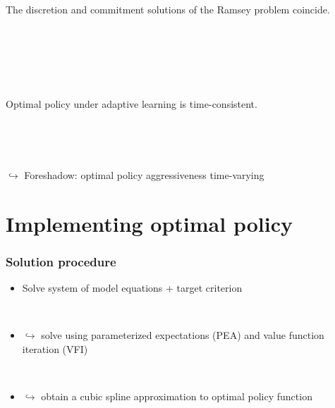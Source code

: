 \documentclass[11pt]{beamer}
\begin{document}
\begin{frame}
	\frametitle{}
	\label{no_commitment}

\begin{lemma} The discretion and commitment solutions of the Ramsey problem coincide. 
\end{lemma}

\

\hfill \hyperlink{no_commitment_intuition}{}

\

\

\begin{corollary} Optimal policy under adaptive learning is time-consistent. 
\end{corollary}


\

\

$\hookrightarrow $ Foreshadow: optimal policy aggressiveness time-varying

\vfill




\end{frame}

\section{Implementing optimal policy}


\begin{frame}
	\frametitle{Solution procedure}
	
\begin{itemize}
\item[] Solve system of model equations + target criterion 

\

\item[] $\hookrightarrow$ solve using parameterized expectations (PEA) and value function iteration (VFI)

\


\item[] $\hookrightarrow$ obtain a cubic spline approximation to optimal policy function

\

\end{itemize}


\end{frame}
\end{document}

